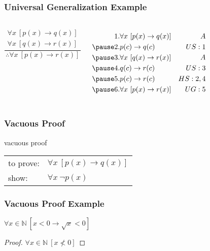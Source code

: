 \documentclass[dvipsnames]{beamer}
\begin{document}
\begin{frame}
  \frametitle{Universal Generalization Example}

  \begin{columns}
    \[
    \frac
      {
        \begin{array}{c}
          \forall x~[p(x) \rightarrow q(x)]\\
          \forall x~[q(x) \rightarrow r(x)]
        \end{array}
      }
      {
        \therefore \forall x~[p(x) \rightarrow r(x)]
      }
    \]

    \pause
    \begin{eqnarray*}
      1. & \forall x~[p(x) \rightarrow q(x)] & A\\\pause
      2. & p(c) \rightarrow q(c)             & US:1\\\pause
      3. & \forall x~[q(x) \rightarrow r(x)] & A\\\pause
      4. & q(c) \rightarrow r(c)             & US:3\\\pause
      5. & p(c) \rightarrow r(c)             & HS:2,4\\\pause
      6. & \forall x~[p(x) \rightarrow r(x)] & UG:5
    \end{eqnarray*}
  \end{columns}
\end{frame}

\begin{frame}
  \frametitle{Vacuous Proof}

  \begin{block}{vacuous proof}
    \begin{tabular}{ll}
      to prove: & $\forall x~[p(x) \rightarrow q(x)]$\\
      show:     & $\forall x~\neg p(x)$
    \end{tabular}
  \end{block}
\end{frame}

\begin{frame}
  \frametitle{Vacuous Proof Example}

  \begin{theorem}
    $\forall x \in \mathbb{N}~[x < 0 \rightarrow \sqrt{x} < 0]$
  \end{theorem}

  \pause
  \begin{proof}
    $\forall x \in \mathbb{N}~[x \nless 0]$
  \end{proof}
\end{frame}
\end{document}

